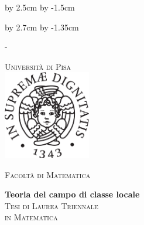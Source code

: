 \advance\vsize by 2.5cm %
\advance\voffset by -1.5cm %


\begin{titlingpage}


\advance\hsize by 2.7cm %
\advance\hoffset by -1.35cm %




\calccentering{\unitlength}
\begin{adjustwidth*}{\unitlength}{-\unitlength}


\thispagestyle{empty}
\begin{center}
\large
\textsc{\Large Università di Pisa\\}
\vspace{0.6cm}
\includegraphics[width=3.8cm]{cherubino.pdf}

\vspace{0.8cm}
\textsc{\Large{Facoltà di Matematica}}\\



\vspace{3.0cm}


{\Huge\textbf{Teoria del campo di classe locale}}
\\[2.5cm]

\textsc{Tesi di Laurea Triennale \\[0.2cm] in Matematica}\\
\vspace{0.5cm}

\begin{center}

\end{center}

\vspace{0.6cm}

%
%


\end{center}
\end{adjustwidth*}
\end{titlingpage}
